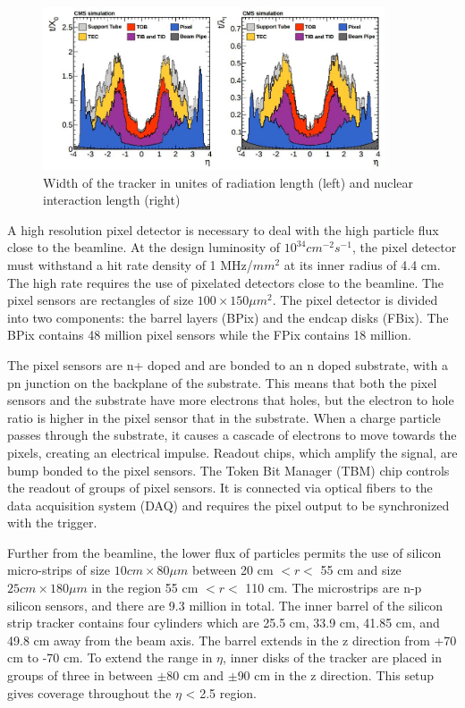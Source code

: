 \documentclass[oneside, letterpaper, oldfontcommands]{memoir}
\begin{document}
\begin{figure}[here]
\includegraphics[width=0.9\textwidth]{trackerlength.jpg}
\caption{Width of the tracker in unites of radiation length (left) and nuclear interaction length (right) \cite{Chatrchyan:2014fea}}
\label{fig:trackerlength}
\end{figure}


\qquad A high resolution pixel detector is necessary to deal with the high particle flux close to the beamline.  At the design luminosity of $10^{34} cm^{-2} s^{-1}$, the pixel detector must withstand a hit rate density of 1 MHz/$mm^{2}$ at its inner radius of 4.4 cm. The high rate requires the use of pixelated detectors close to the beamline. The pixel sensors are rectangles of size $100 \times 150 \mu m^{2}$. The pixel detector is divided into two components: the barrel layers (BPix) and the endcap disks (FBix). The BPix contains 48 million pixel sensors while the FPix contains 18 million.

\qquad The pixel sensors are n+ doped and are bonded to an n doped substrate, with a pn junction on the backplane of the substrate. This means that both the pixel sensors and the substrate have more electrons that holes, but the electron to hole ratio is higher in the pixel sensor that in the substrate. When a charge particle passes through the substrate, it causes a cascade of electrons to move towards the pixels, creating an electrical impulse. Readout chips, which amplify the signal, are bump bonded \cite{Chiochia:2007pu} to the pixel sensors. The Token Bit Manager (TBM) chip controls the readout of groups of pixel sensors. It is connected via optical fibers to the data acquisition system (DAQ) and requires the pixel output to be synchronized with the trigger.

\qquad Further from the beamline, the lower flux of particles permits the use of silicon micro-strips of size $10 cm \times 80 \mu m$ between 20 cm $< r < $ 55 cm and size $25 cm \times 180 \mu m$ in the region 55 cm $ < r < $ 110 cm. The microstrips are n-p silicon sensors, and there are 9.3 million in total. The inner barrel of the silicon strip tracker contains four cylinders which are 25.5 cm, 33.9 cm, 41.85 cm, and 49.8 cm away from the beam axis. The barrel extends in the z direction from +70 cm to -70 cm. To extend the range in $\eta$, inner disks of the tracker are placed in groups of three in between $\pm$80 cm and $\pm$90 cm in the z direction. This setup gives coverage throughout the $\eta$ < 2.5 region.
\end{document}

